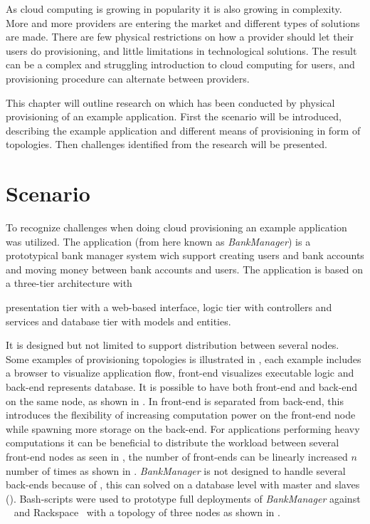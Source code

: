 
As cloud computing is growing in popularity it is also growing in complexity.
More and more providers are entering the market and different types of solutions are made.
There are few physical restrictions on how a provider should let their users do provisioning,
and little limitations in technological solutions.  
The result can be a complex and struggling introduction to cloud computing for users,
and provisioning procedure can alternate between providers.

This chapter will outline research on which has been conducted by
physical provisioning of an example application.
First the scenario will be introduced, describing the example application
and different means of provisioning in form of topologies.
Then challenges identified from the research will be presented.

\section{Scenario}



To recognize challenges when doing cloud provisioning an example application~\cite{BankManager} was utilized.
The application (from here known as \emph{BankManager}) is a prototypical bank manager system
wich support creating users and bank accounts and moving money between bank accounts and users.
The application is based on a three-tier architecture with 
\begin{ii} 
  \iitem presentation tier with a web-based interface,
  \iitem logic tier with controllers and services and
  \iitem database tier with models and entities.
\end{ii}
It is designed but not limited to support distribution between several nodes.
Some examples of provisioning topologies is illustrated in , each
example includes a browser to visualize application flow, front-end visualizes executable
logic and back-end represents database.
It is possible to have both front-end and back-end on the same node, as shown in .
In  front-end is separated from back-end, 
this introduces the flexibility of increasing computation power on the front-end node while spawning more
storage on the back-end. 
For applications performing heavy computations it can be beneficial to distribute the workload between several
front-end nodes as seen in , the number of front-ends can be linearly increased 
$n$ number of times as shown in .
\emph{BankManager} is not designed to handle several back-ends because of ,
this can solved on a database level with master and slaves ().
Bash-scripts were used to prototype full deployments of \emph{BankManager} against 
~\cite{aws}
and Rackspace~\cite{rackspace} with a topology of three nodes as shown in .


